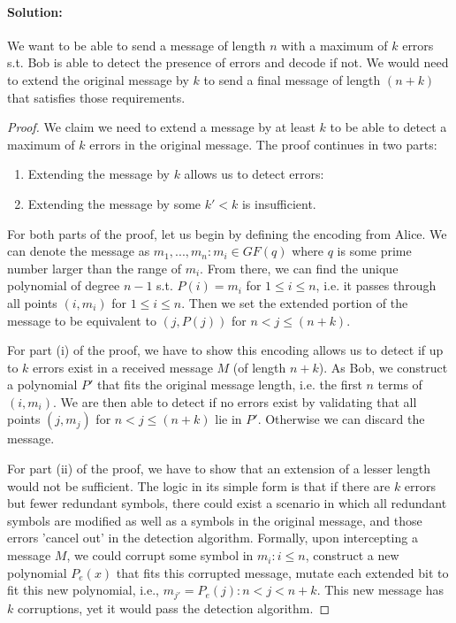 \documentclass[11pt, notitlepage]{report}
\newenvironment{solution}{\paragraph{Solution:}}{\hfill}
\begin{document}
\begin{solution}
	We want to be able to send a message of length $n$ with a maximum of $k$ errors s.t. Bob is able to detect the presence of errors and decode if not. We would need to extend the original message by $k$ to send a final message of length $(n+k)$ that satisfies those requirements.
	\begin{proof}
		We claim we need to extend a message by at least $k$ to be able to detect a maximum of $k$ errors in the original message. The proof continues in two parts:
		\begin{enumerate}[label=\roman*.)]
		\item Extending the message by $k$ allows us to detect errors:
		\item Extending the message by some $k'<k$ is insufficient.
		\end{enumerate}
		For both parts of the proof, let us begin by defining the encoding from Alice.  We can denote the message as $m_1,...,m_n:m_i \in GF(q)$ where $q$ is some prime number larger than the range of $m_i$. From there, we can find the unique polynomial of degree $n-1$ s.t. $P(i)=m_i$ for $1\leq i\leq n$, i.e. it passes through all points $(i,m_i)$ for $1\leq i\leq n$. Then we set the extended portion of the message to be equivalent to $(j, P(j))$ for $n< j \leq (n+k)$.
		
		For part (i) of the proof, we have to show this encoding allows us to detect if up to $k$ errors exist in a received message $M$ (of length $n+k$). As Bob, we construct a polynomial $P'$ that fits the original message length, i.e. the first $n$ terms of $(i,m_i)$. We are then able to detect if no errors exist by validating that all points $(j, m_j)$ for $n< j \leq (n+k)$ lie in $P'$. Otherwise we can discard the message.
		
		For part (ii) of the proof, we have to show that an extension of a lesser length would not be sufficient. The logic in its simple form is that if there are $k$ errors but fewer redundant symbols, there could exist a scenario in which all redundant symbols are modified as well as a symbols in the original message, and those errors 'cancel out' in the detection algorithm. Formally, upon intercepting a message $M$, we could corrupt some symbol in $m_i:i\leq n$, construct a new polynomial $P_e(x)$ that fits this corrupted message, mutate each extended bit to fit this new polynomial, i.e., $m_{j'}=P_e(j):n < j < n+k$. This new message has $k$ corruptions, yet it would pass the detection algorithm.
	\end{proof}
\end{solution}
\end{document}
